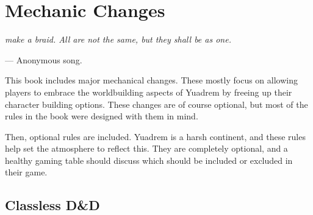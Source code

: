 \chapter{Mechanic Changes}
\begin{linenumbers}
\textit{make a braid.
All are not the same, but they shall be as one.}

\hspace*{\fill} --- Anonymous song.

This book includes major mechanical changes.
These mostly focus on allowing players to embrace the worldbuilding aspects of Yuadrem by freeing up their character building options.
These changes are of course optional, but most of the rules in the book were designed with them in mind.

Then, optional rules are included.
Yuadrem is a harsh continent, and these rules help set the atmosphere to reflect this.
They are completely optional, and a healthy gaming table should discuss which should be included or excluded in their game.

%



\section{Classless D\&D}


\end{linenumbers}
